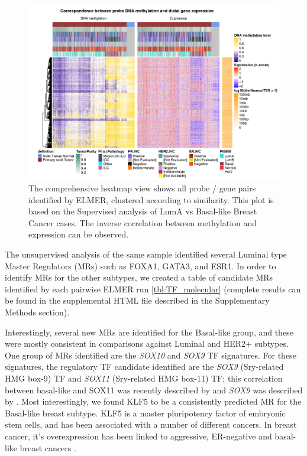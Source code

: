 \begin{figure}[ht!]
\centering
\includegraphics[width=1.0\textwidth]{images/heatmap.jpg}
\caption{\label{fig:heatmap} The comprehensive heatmap view shows all probe / gene pairs identified by ELMER, clustered according to similarity. This plot is based on the Supervised analysis of LumA vs Basal-like Breast Cancer cases. The inverse correlation between methylation and expression can be observed.}
\end{figure}

The unsupervised analysis of the same sample identified several Luminal type Master Regulators (MRs) such as FOXA1, GATA3, and ESR1. In order to identify MRs for the other subtypes, we created a table of candidate MRs identified by each pairwise ELMER run \ref{tbl:TF_molecular} (complete results can be found in the supplemental HTML file described in the Supplementary Methods section). 

Interestingly, several new MRs are identified for the Basal-like group, and these were mostly consistent in comparisons against Luminal and HER2+ subtypes. One group of MRs identified are the \textit{SOX10} and \textit{SOX9} TF signatures. For these signatures, the regulatory TF candidate identified are the \textit{SOX9} (Sry-related HMG box-9) TF and \textit{SOX11} (Sry-related HMG box-11) TF; this correlation between basal-like and SOX11 was recently described by \cite{shepherd2016sox11} and \textit{SOX9} was described by \cite{gong2015foxa1}. Most interestingly, we found KLF5 to be a consistently predicted MR for the Basal-like breast subtype. KLF5 is a master pluripotency factor of embryonic stem cells, and has been associated with a number of different cancers. In breast cancer, it's overexpression has been linked to aggressive, ER-negative and basal-like breast cancers \cite{ben2008embryonic}. %

